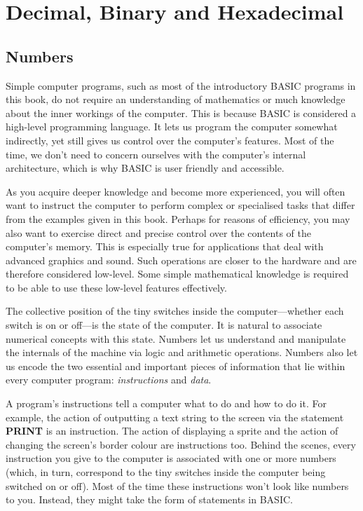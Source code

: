 \chapter{Decimal, Binary and Hexadecimal}

\section{Numbers}
Simple computer programs, such as most of the introductory BASIC programs in this book, do not require an understanding of mathematics or much knowledge about the inner workings of the computer. This is because BASIC is considered a high-level programming language. It lets us program the computer somewhat indirectly, yet still gives us control over the computer’s features. Most of the time, we don’t need to concern ourselves with the computer’s internal architecture, which is why BASIC is user friendly and accessible.

As you acquire deeper knowledge and become more experienced, you will often want to instruct the computer to perform complex or specialised tasks that differ from the examples given in this book. Perhaps for reasons of efficiency, you may also want to exercise direct and precise control over the contents of the computer’s memory. This is especially true for applications that deal with advanced graphics and sound. Such operations are closer to the hardware and are therefore considered low-level. Some simple mathematical knowledge is required to be able to use these low-level features effectively.

The collective position of the tiny switches inside the computer---whether each switch is on or off---is the state of the computer. It is natural to associate numerical concepts with this state. Numbers let us understand and manipulate the internals of the machine via logic and arithmetic operations. Numbers also let us encode the two essential and important pieces of information that lie within every computer program: {\it instructions} and {\it data}.

A program’s instructions tell a computer what to do and how to do it. For example, the action of outputting a text string to the screen via the statement {\bf PRINT} is an instruction. The action of displaying a sprite and the action of changing the screen’s border colour are instructions too. Behind the scenes, every instruction you give to the computer is associated with one or more numbers (which, in turn, correspond to the tiny switches inside the computer being switched on or off). Most of the time these instructions won’t look like numbers to you. Instead, they might take the form of statements in BASIC.


